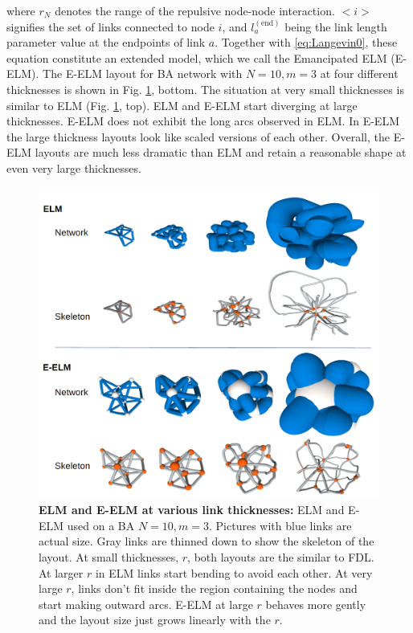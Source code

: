 \documentclass[nofootinbib,preprint,floatfix]{revtex4} %
\begin{document}
where $r_N$ denotes the range of the repulsive node-node interaction. 
$<i>$ signifies the set of links connected to node $i$, and $l_a^\mathrm{(end)}$ being the link length parameter value at the endpoints of link $a$.
Together with \eqref{eq:Langevin0}, these equation constitute an extended model, which we call the Emancipated ELM (E-ELM). 
The E-ELM layout for BA network with $N=10, m=3$ at four different thicknesses is shown in  
Fig. \ref{fig:ELM}, bottom. The situation at very small thicknesses is similar to ELM (Fig. \ref{fig:ELM}, top). ELM and E-ELM start diverging at large thicknesses. E-ELM does not exhibit the long arcs observed in ELM. In E-ELM the large thickness layouts look like scaled versions of each other. Overall, the E-ELM layouts are much less dramatic than ELM and retain a reasonable shape at even very large thicknesses.
%
\begin{figure}
    \centering
    \includegraphics[width = .7\columnwidth]{fig-09-19/ELM-E-ELM.png}
    \caption{{\bf ELM and E-ELM at various link thicknesses:} ELM and E-ELM used on a BA $N=10, m=3$. Pictures with blue links are actual size. Gray links are thinned down to show the skeleton of the layout.  At small thicknesses, $r$, both layouts are the similar to FDL. At larger $r$ in ELM links start bending to avoid each other. At very large $r$, links don't fit inside the region containing the nodes and start making outward arcs. E-ELM at large $r$ behaves more gently and the layout size just grows linearly with the $r$.}
    \label{fig:ELM}
\end{figure}
\end{document}
